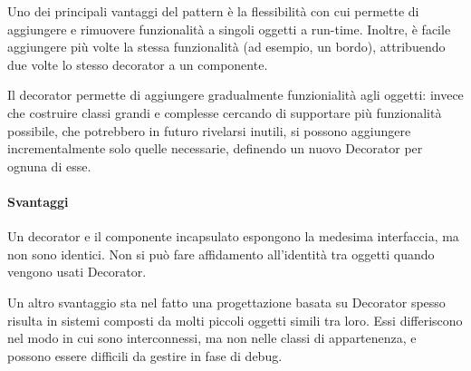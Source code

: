 Uno dei principali vantaggi del pattern è la flessibilità con cui permette di
aggiungere e rimuovere funzionalità a singoli oggetti a run-time. Inoltre, è
facile aggiungere più volte la stessa funzionalità (ad esempio, un bordo),
attribuendo due volte lo stesso decorator a un componente.

Il decorator permette di aggiungere gradualmente funzionialità agli oggetti:
invece che costruire classi grandi e complesse cercando di supportare più
funzionalità possibile, che potrebbero in futuro rivelarsi inutili, si possono
aggiungere incrementalmente solo quelle necessarie, definendo un nuovo Decorator
per ognuna di esse.

\paragraph{Svantaggi}

Un decorator e il componente incapsulato espongono la medesima interfaccia, ma
non sono identici. Non si può fare affidamento all'identità tra oggetti quando
vengono usati Decorator.

Un altro svantaggio sta nel fatto una progettazione basata su Decorator spesso
risulta in sistemi composti da molti piccoli oggetti simili tra loro. Essi
differiscono nel modo in cui sono interconnessi, ma non nelle classi di
appartenenza, e possono essere difficili da gestire in fase di debug.
